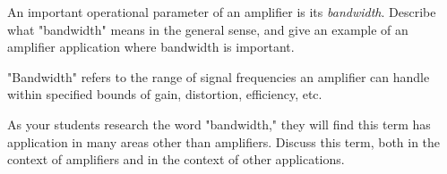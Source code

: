 

An important operational parameter of an amplifier is its {\it bandwidth}.  Describe what "bandwidth" means in the general sense, and give an example of an amplifier application where bandwidth is important.







"Bandwidth" refers to the range of signal frequencies an amplifier can handle within specified bounds of gain, distortion, efficiency, etc.







As your students research the word "bandwidth," they will find this term has application in many areas other than amplifiers.  Discuss this term, both in the context of amplifiers and in the context of other applications.




